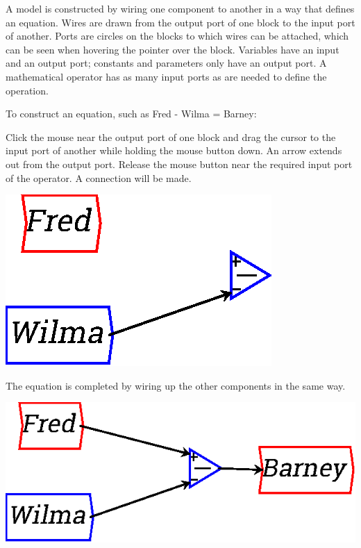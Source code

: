 A model is constructed by wiring one component to another in a way
that defines an equation. Wires are drawn from the output port of one
block to the input port of another. Ports are circles on the blocks to
which wires can be attached, which can be seen when hovering the
pointer over the block. Variables have an input and an output
port; constants and parameters only have an output port. A
mathematical operator has as many input ports as are needed to define
the operation.


To construct an equation, such as Fred - Wilma = Barney:

Click the mouse near the output port of one block and drag the
cursor to the input port of another while holding the mouse button
down. An arrow extends out from the output port. Release the mouse
button near the required input port of the operator. A connection will
be made.

\begin{center}
\includegraphics{images/NewItem181.eps} 
\end{center}


The equation is completed by wiring up the other components in the same way.

\begin{center}
\includegraphics{images/NewItem182.eps} 
\end{center}


